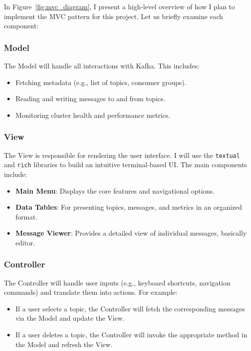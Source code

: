 \documentclass[10pt , a4paper]{report}
\begin{document}
In Figure~\ref{fig:mvc_diagram}, I present a high-level overview of how I plan to implement the MVC pattern for this project. Let us briefly examine each component:

\subsubsection{Model}

The Model will handle all interactions with Kafka. This includes:
\begin{itemize}
    \item Fetching metadata (e.g., list of topics, consumer groups).
    \item Reading and writing messages to and from topics.
    \item Monitoring cluster health and performance metrics.
\end{itemize}

\subsubsection{View}

The View is responsible for rendering the user interface. I will use the \texttt{textual} and \texttt{rich} libraries to build an intuitive terminal-based UI. The main components include:
\begin{itemize}
    \item \textbf{Main Menu}: Displays the core features and navigational options.
    \item \textbf{Data Tables}: For presenting topics, messages, and metrics in an organized format.
    \item \textbf{Message Viewer}: Provides a detailed view of individual messages, basically editor.
\end{itemize}

\subsubsection{Controller}

The Controller will handle user inputs (e.g., keyboard shortcuts, navigation commands) and translate them into actions. For example:
\begin{itemize}
    \item If a user selects a topic, the Controller will fetch the corresponding messages via the Model and update the View.
    \item If a user deletes a topic, the Controller will invoke the appropriate method in the Model and refresh the View.
\end{itemize}
\end{document}
